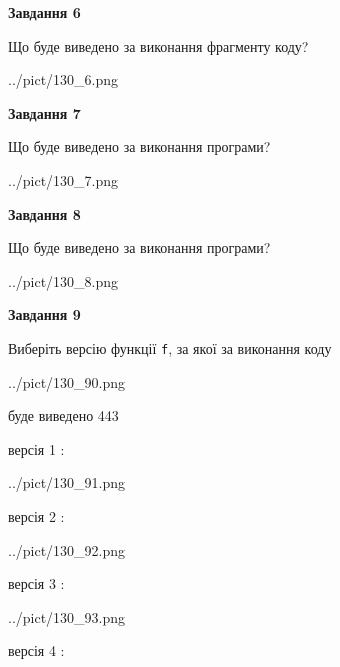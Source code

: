 \documentclass[12pt, ukrainian]{article}
\def\code#1{\Verb!#1!}
\begin{document}
{\begin {large}
{\begin {center}\textbf{Завдання 6}\end {center}}

Що буде виведено за виконання фрагменту коду?\par
\begin{center}
	{../pict/130_6.png}
\end{center}
\newpage

{\begin {center}\textbf{Завдання 7}\end {center}}

Що буде виведено за виконання програми?\par
\begin{center}
	{../pict/130_7.png}
\end{center}
\newpage

{\begin {center}\textbf{Завдання 8}\end {center}}

Що буде виведено за виконання програми?\par
\begin{center}
	{../pict/130_8.png}
\end{center}
\newpage

{\begin {center}\textbf{Завдання 9}\end {center}}

Виберіть версію функції \code{f}, за якої за виконання коду
\begin{center}
	{../pict/130_90.png}
\end{center}
буде виведено 443

\vspace{5mm}
версія 1 :

\begin{center}
	{../pict/130_91.png}
\end{center}
версія 2 :

\begin{center}
	{../pict/130_92.png}
\end{center}
версія 3 :

\begin{center}
	{../pict/130_93.png}
\end{center}
версія 4 :


\end{large}}
\end{document}
